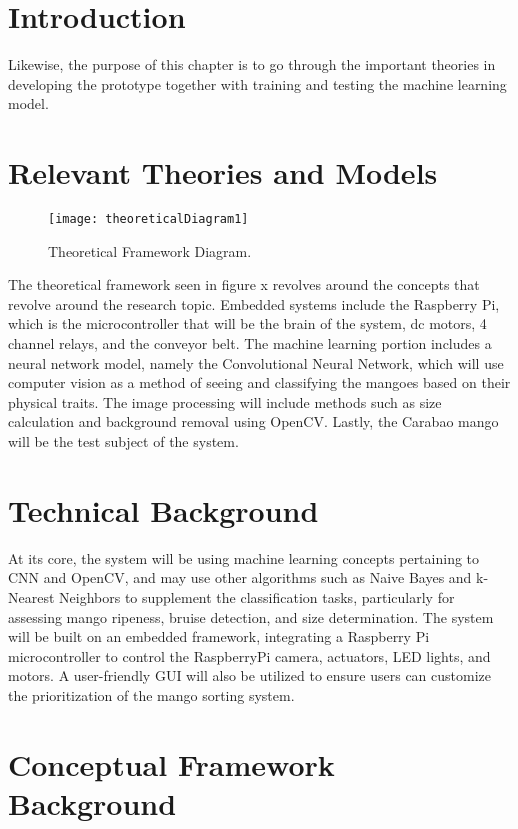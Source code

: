 

\section{Introduction}

Likewise, the purpose of this chapter is to go through the important theories in developing the prototype together with training and testing the machine learning model.

\section{Relevant Theories and Models}

\begin{figure}[!htbp]
	\centering
	\texttt{[image: theoreticalDiagram1]}
	\caption{Theoretical Framework Diagram.}
	\label{fig:theoreticalDiagram1}
\end{figure}


The theoretical framework seen in figure x revolves around the concepts that revolve around the research topic. Embedded systems include the Raspberry Pi, which is the microcontroller that will be the brain of the system, \gls{dc} motors, 4 channel relays, and the conveyor belt. The machine learning portion includes a neural network model, namely the Convolutional Neural Network, which will use computer vision as a method of seeing and classifying the mangoes based on their physical traits. The image processing will include methods such as size calculation and background removal using OpenCV. Lastly, the Carabao mango will be the test subject of the system.

\section{Technical Background}

At its core, the system will be using machine learning concepts pertaining to \gls{CNN} and OpenCV, and may use other algorithms such as Naive Bayes and k-Nearest Neighbors to supplement the classification tasks, particularly for assessing mango ripeness, bruise detection, and size determination. The system will be built on an embedded framework, integrating a Raspberry Pi microcontroller to control the RaspberryPi camera, actuators, LED lights, and motors. A user-friendly GUI will also be utilized to ensure users can customize the prioritization of the mango sorting system.

\section{Conceptual Framework Background}


